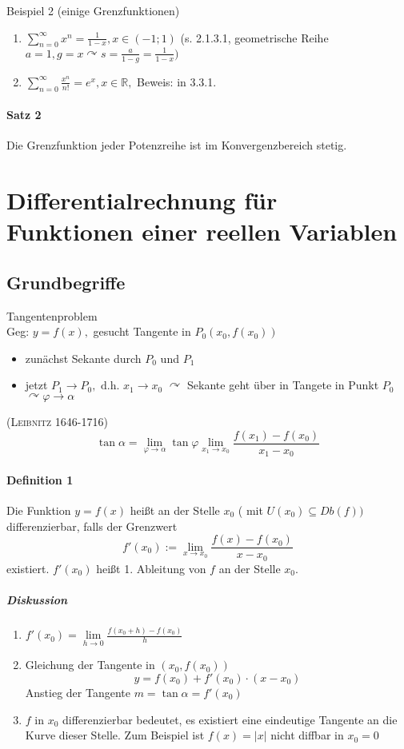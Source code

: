 \documentclass[a4paper]{scrartcl}
\begin{document}
Beispiel 2 (einige Grenzfunktionen)
\begin{enumerate}
\item $\sum\limits_{n=0}^{\infty} x^n = \frac{1}{1-x}, x \in (-1;1)$ (s. 2.1.3.1, geometrische Reihe $a=1, g=x \curvearrowright s = \frac{a}{1-g} = \frac{1}{1-x})$
\item $\sum\limits_{n=0}^{\infty} \frac{x^n}{n!} = e^x, x \in \mathbb{R},$ Beweis: in 3.3.1.
\end{enumerate}
\paragraph{Satz 2} Die Grenzfunktion jeder Potenzreihe ist im Konvergenzbereich stetig.

\section{Differentialrechnung für Funktionen einer reellen Variablen}
\subsection{Grundbegriffe}
Tangentenproblem\\
Geg: $y=f(x),$ gesucht Tangente in $P_0 (x_0, f(x_0))$
\begin{itemize}
\item zunächst Sekante durch $P_0$ und $P_1$
\item jetzt $P_1 \to P_0, \text{ d.h. } x_1 \to x_0$
$\curvearrowright$ Sekante geht über in Tangete in Punkt $P_0$
$\curvearrowright \varphi \to \alpha$
\end{itemize}
(\textsc{Leibnitz} 1646-1716)
\[\tan{\alpha} = \lim\limits_{\varphi \to \alpha} \tan{\varphi} \lim\limits_{x_1 \to x_0} \frac{f(x_1) - f(x_0)}{x_1 -x_0}\]

\paragraph{Definition 1} Die Funktion $y=f(x)$ heißt an der Stelle $x_0$ ( mit $U(x_0) \subseteq Db(f) )$ differenzierbar, falls der Grenzwert
\[f'(x_0) := \lim\limits_{x \to x_0} \frac{f(x) - f(x_0)}{x - x_0} \] existiert. $f'(x_0)$ heißt 1. Ableitung von $f$ an der Stelle $x_0$.

\subparagraph{Diskussion}
\begin{enumerate}
\item $f'(x_0) = \lim\limits_{h \to 0} \frac{f(x_0 +h) - f(x_0)}{h}$
\item Gleichung der Tangente in $(x_0,f(x_0))$
\[ y= f(x_0) + f'(x_0) \cdot (x-x_0) \]
Anstieg der Tangente $m=\tan{\alpha} = f'(x_0)$
\item $f$ in $x_0$ differenzierbar bedeutet, es existiert eine eindeutige Tangente an die Kurve dieser Stelle. Zum Beispiel ist $f(x) = \lvert x \rvert$ nicht diffbar in $x_0 = 0$
\end{enumerate}
\end{document}
